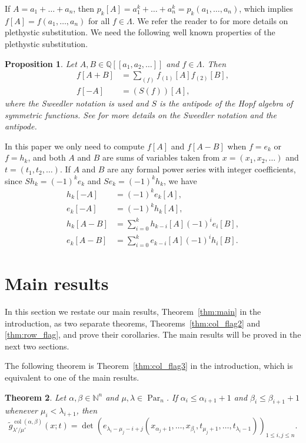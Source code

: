 \documentclass[12pt]{amsart}
\numberwithin{equation}{section}
\newtheorem{thm}{Theorem}[section]
\newtheorem{prop}[thm]{Proposition}
\theoremstyle{definition}
\newcommand\wg{\widetilde{g}}
\newcommand\col{\operatorname{col}}
\newcommand\NN{\mathbb{N}}
\newcommand\Par{\operatorname{Par}}
\begin{document}
If $A=a_1+\dots+a_n$, then $p_k[A]=a_1^k+\dots+a_n^k=p_k(a_1,\dots,a_n)$, which
implies $f[A]=f(a_1,\dots,a_n)$ for all $f\in\Lambda$. We refer the reader to
\cite{Loehr_2010} for more details on plethystic substitution. We need the
following well known properties of the plethystic substitution.


\begin{prop}\label{prop:plethysm}
  Let $A,B\in \mathbb{Q}[[a_1,a_2,\dots]]$ and $f\in \Lambda$.
  Then 
\begin{align*}
  f[A+B] &=  \sum_{(f)}f_{(1)}[A] f_{(2)}[B],\\
  f[-A] &= (S(f))[A],
\end{align*}
where the Sweedler notation is used and $S$ is the antipode of the Hopf algebra
of symmetric functions. See \cite{grinberg14:hopf_algeb_combin} for more details
on the Sweedler notation and the antipode.
\end{prop}


In this paper we only need to compute $f[A]$ and $f[A-B]$ when $f=e_k$ or
$f=h_k$, and both $A$ and $B$ are sums of variables taken from
$x=(x_1,x_2,\dots)$ and $t=(t_1,t_2,\dots)$. If $A$ and $B$ are any formal power
series with integer coefficients, since $Sh_k=(-1)^ke_k$ and $Se_k=(-1)^kh_k$,
we have
\begin{align}
  \label{eq:h_k[-A]}
  h_k[-A]&= (-1)^k e_k[A],\\
  \label{eq:e_k[-A]}
  e_k[-A]&= (-1)^k h_k[A],\\
  \label{eq:h_k}
  h_k[A-B]&= \sum_{i=0}^kh_{k-i}[A](-1)^i e_i[B],\\
  \label{eq:e_k}
  e_k[A-B]&= \sum_{i=0}^ke_{k-i}[A](-1)^i h_i[B].
\end{align}




\section{Main results}
\label{sec:main}


In this section we restate our main results, Theorem~\ref{thm:main} in the
introduction, as two separate theorems, Theorems~\ref{thm:col_flag2} and
\ref{thm:row_flag}, and prove their corollaries. The main results will be proved
in the next two sections.

The following theorem is Theorem~\ref{thm:col_flag3} in the introduction, which
is equivalent to one of the main results.


\begin{thm}\label{thm:col_flag}
  Let $\alpha,\beta\in\NN^n$ and $\mu,\lambda\in\Par_n$. 
If $\alpha_i\le \alpha_{i+1}+1$ and $\beta_i\le \beta_{i+1}+1$ whenever
$\mu_i<\lambda_{i+1}$, then
\[
\wg_{\lambda'/\mu'}^{\col(\alpha,\beta)}(x;t)  = \det \left(
    e_{\lambda_i-\mu_j-i+j}(x_{\alpha_j+1},\dots, x_{\beta_i},t_{\mu_j+1},\dots,t_{\lambda_i-1})
  \right)_{1\le i,j\le n}.
\]
\end{thm}
\end{document}
